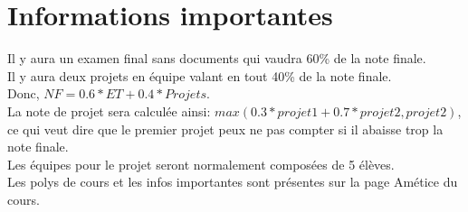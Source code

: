 \section{Informations importantes}
Il y aura un examen final sans documents qui vaudra 60\% de la note finale.\\
Il y aura deux projets en équipe valant en tout 40\% de la note finale.\\
Donc, $NF = 0.6*ET + 0.4*Projets$.\\
La note de projet sera calculée ainsi: $max(0.3*projet1 + 0.7*projet2, projet2)$,
ce qui veut dire que le premier projet peux ne pas compter si il abaisse trop la note finale.\\
Les équipes pour le projet seront normalement composées de 5 élèves.\\
Les polys de cours et les infos importantes sont présentes sur la page Amétice du cours.
